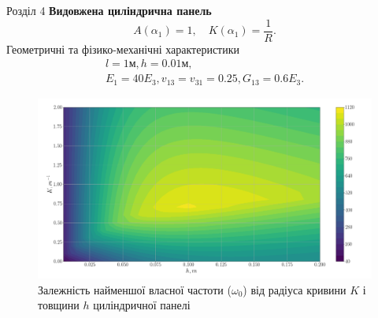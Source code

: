 \documentclass[handout, 8pt]{beamer}
\numberwithin{figure}{section}
\numberwithin{equation}{section}
\numberwithin{table}{section}
\begin{document}
\begin{frame}{Розділ 4}
\textbf{Видовжена циліндрична панель}
\begin{equation}
A\left( \alpha_1 \right)=1, \quad K\left( \alpha_1 \right)=\frac{1}{R}.
\end{equation}
Геометричні та фізико-механічні характеристики
\begin{equation}
\begin{gathered}
l=1\text{м}, h=0.01\text{м},\\
E_1=40E_3, v_{13}=v_{31}=0.25, G_{13}=0.6E_3.
\end{gathered}
\end{equation}

\begin{figure}
	\includegraphics[scale=0.17]{pic/thickness_curvature_contour_plot2.png}
		\caption{Залежність найменшої власної частоти ($\omega_0$) від радіуса кривини $K$ і товщини $h$ циліндричної панелі}
		\label{fig:omaga_K_h}
\end{figure}
\end{frame}
\end{document}
